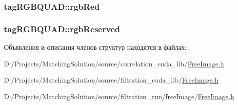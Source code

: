 \hypertarget{structtag_r_g_b_q_u_a_d_a143fcd3ff08a04b152bee9d410821a6}{
\subsubsection[{rgbRed}]{ {\bf tagRGBQUAD::rgbRed}}}
\label{structtag_r_g_b_q_u_a_d_a143fcd3ff08a04b152bee9d410821a6}


\hypertarget{structtag_r_g_b_q_u_a_d_2758aec56e37d4f3f5fde511a58f4f82}{
\subsubsection[{rgbReserved}]{ {\bf tagRGBQUAD::rgbReserved}}}
\label{structtag_r_g_b_q_u_a_d_2758aec56e37d4f3f5fde511a58f4f82}




Объявления и описания членов структур находятся в файлах:\begin{CompactItemize}
\item 
D:/Projects/MatchingSolution/source/correlation\_\-cuda\_\-lib/\hyperlink{correlation__cuda__lib_2_free_image_8h}{FreeImage.h}\item 
D:/Projects/MatchingSolution/source/filtration\_\-cuda\_\-lib/\hyperlink{filtration__cuda__lib_2_free_image_8h}{FreeImage.h}\item 
D:/Projects/MatchingSolution/source/filtration\_\-run/freeImage/\hyperlink{filtration__run_2free_image_2_free_image_8h}{FreeImage.h}\end{CompactItemize}
